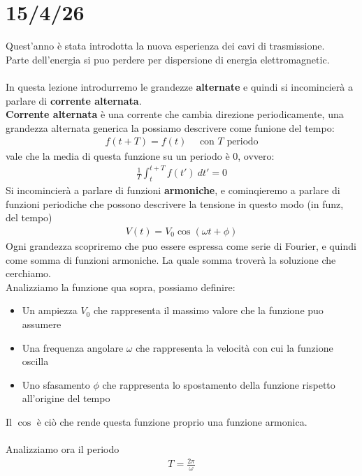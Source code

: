 \documentclass[a4paper, oneside]{article}
\begin{document}
\newpage
\section{15/4/26}
Quest'anno è stata introdotta la nuova esperienza dei cavi di trasmissione.\\
Parte dell'energia si puo perdere per dispersione di energia elettromagnetic.\\\\
In questa lezione introdurremo le grandezze \textbf{alternate} e quindi si incomincierà a parlare di \textbf{corrente alternata}.\\
\textbf{Corrente alternata} è una corrente che cambia direzione periodicamente, una grandezza alternata generica la possiamo descrivere come funione del tempo:
\begin{gather*}
    f(t + T) = f(t) \quad \text{ con } T \text{ periodo}
\end{gather*}
vale che la media di questa funzione su un periodo è 0, ovvero:
\begin{gather*}
    \frac{1}{T} \int_{t}^{t+T} f(t') \ dt' = 0
\end{gather*}
Si incomincierà a parlare di funzioni \textbf{armoniche}, e cominqieremo a parlare di funzioni periodiche che possono descrivere la tensione in questo modo (in funz, del tempo)
\begin{gather*}
    V(t) = V_0 \cos(\omega t + \phi)
\end{gather*}
Ogni grandezza scopriremo che puo essere espressa come serie di Fourier, e quindi come somma di funzioni armoniche. La quale somma troverà la soluzione che cerchiamo.\\
Analizziamo la funzione qua sopra, possiamo definire:
\begin{itemize}
    \item Un ampiezza $V_0$ che rappresenta il massimo valore che la funzione puo assumere
    \item Una frequenza angolare $\omega$ che rappresenta la velocità con cui la funzione oscilla
    \item Uno sfasamento $\phi$ che rappresenta lo spostamento della funzione rispetto all'origine del tempo
\end{itemize}
Il $\cos$ è ciò che rende questa funzione proprio una funzione armonica.\\
\hfill\\
Analizziamo ora il periodo
\begin{gather*}
    T = \frac{2\pi}{\omega}
\end{gather*}
\end{document}

